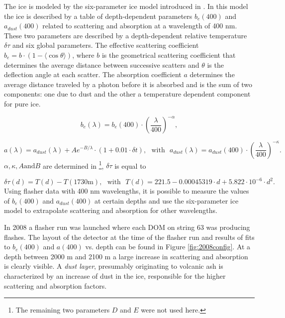 The ice is modeled by the six-parameter ice model introduced in \cite{Ackermann:2006pva}. In this model the ice is described by a table of depth-dependent parameters $b_e(400)$ and $a_{dust}(400)$ related to scattering and absorption at a wavelength of 400 nm. These two parameters are described by a depth-dependent relative temperature $\delta \tau$ and six global parameters. The effective scattering coefficient $b_e = b \cdot \left( 1-\langle \cos \theta \rangle \right)$, where $b$ is the geometrical scattering coefficient that determines the average distance between successive scatters and $\theta$ is the deflection angle at each scatter. The absorption coefficient $a$ determines the average distance traveled by a photon before it is absorbed and is the sum of two components: one due to dust and the other a temperature dependent component for pure ice.

\begin{equation}
b_e(\lambda)  = b_e(400) \cdot \left( \frac{\lambda}{400}\right)^{-\alpha},
\end{equation}

\begin{equation}
a(\lambda) = a_{dust}(\lambda) + A e^{-B/\lambda} \cdot (1+0.01 \cdot \delta t), \ \ \ \textrm{with} \ \ \ a_{dust}(\lambda) = a_{dust}(400) \cdot \left( \frac{\lambda}{400}\right)^{-\kappa}.
\end{equation}
$\alpha, \kappa, A \textrm{and} B$ are determined in \cite{Ackermann:2006pva}\footnote{The remaining two parameters $D$ and $E$ were not used here.}, $\delta \tau$ is equal to

\begin{equation}
\delta \tau(d) = T(d) - T(1730 \textrm{m}), \ \ \ \textrm{with} \ \ \ T(d) = 221.5 - 0.00045319 \cdot d + 5.822 \cdot 10^{-6} \cdot d^2.
\end{equation}
Using flasher data with 400 nm wavelengths, it is possible to measure the values of $b_e(400)$ and $a_{dust}(400)$ at certain depths and use the six-parameter ice model to extrapolate scattering and absorption for other wavelengths. 

In 2008 a flasher run was launched where each DOM on string 63 was producing flashes. The layout of the detector at the time of the flasher run and results of fits to $b_{e}(400)$ and $a(400)$ vs. depth can be found in Figure \ref{fig:2008config}. At a depth between 2000 m and 2100 m a large increase in scattering and absorption is clearly visible. A \textit{dust layer}, presumably originating to volcanic ash is characterized by an increase of dust in the ice, responsible for the higher scattering and absorption factors.

